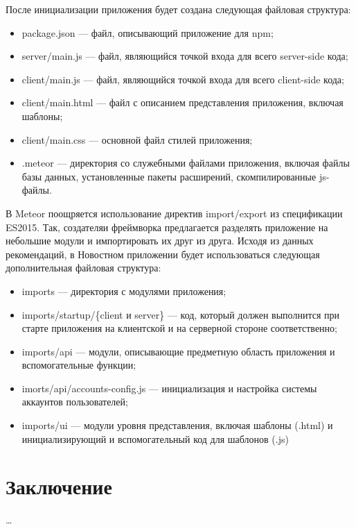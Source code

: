 \documentclass[a4paper,12pt]{article}
\begin{document}
После инициализации приложения будет создана следующая файловая структура:
\begin{itemize}
	\item package.json --- файл, описывающий приложение для npm;
	\item server/main.js --- файл, являющийся точкой входа для
	всего server-side кода;
	\item client/main.js --- файл, являющийся точкой входа для
	всего client-side кода;
	\item client/main.html --- файл с описанием представления приложения,
	включая шаблоны;
	\item client/main.css --- основной файл стилей приложения;
	\item .meteor --- директория со служебными файлами приложения, включая
	файлы базы данных, установленные пакеты расширений, скомпилированные 
	js-файлы.
\end{itemize}

В Meteor поощряется использование директив import/export из спецификации
ES2015. Так, создателяи фреймворка предлагается разделять приложение
на небольшие модули и импортировать их друг из друга. Исходя из
данных рекомендаций, в Новостном приложении будет использоваться следующая
дополнительная файловая структура:

\begin{itemize}
	\item imports --- директория с модулями приложения;
	\item imports/startup/\{client и server\} --- код, который должен выполнится
	при старте приложения на клиентской и на серверной стороне соответственно;
	\item imports/api --- модули, описывающие предметную область приложения
	и вспомогательные функции;
	\item imorts/api/accounts-config.js --- инициализация и настройка системы аккаунтов пользователей;
	\item imports/ui --- модули уровня представления, включая шаблоны (.html) 
	и инициализирующий и вспомогательный код для шаблонов (.js)
\end{itemize}

\section*{Заключение}
\dots

\begin{thebibliography}{99}
	
\end{thebibliography}
\end{document}
